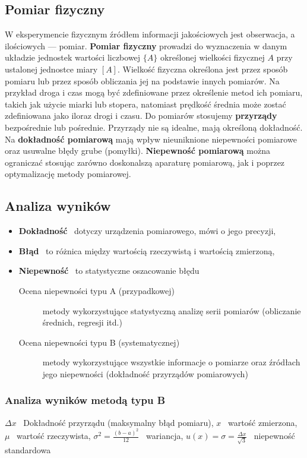 \documentclass[../Fizyka.tex]{subfiles}
\begin{document}
    \subsection{Pomiar fizyczny}
    W eksperymencie fizycznym źródłem informacji jakościowych jest obserwacja, a ilościowych — pomiar. \textbf{Pomiar fizyczny} prowadzi do wyznaczenia 
    w danym układzie jednostek wartości liczbowej \(\{A\}\) określonej wielkości fizycznej \(A\) przy ustalonej jednostce miary \([A]\).
    Wielkość fizyczna określona jest przez sposób pomiaru lub przez sposób obliczania jej na podstawie innych pomiarów.
    Na przykład droga i czas mogą być zdefiniowane przez określenie metod ich pomiaru, takich jak użycie miarki lub stopera, natomiast
    prędkość średnia może zostać zdefiniowana jako iloraz drogi i czasu.
    Do pomiarów stosujemy \textbf{przyrządy} bezpośrednie lub pośrednie. Przyrządy nie są idealne, mają określoną dokładność.
    Na \textbf{dokładność pomiarową} mają wpływ nieuniknione niepewności pomiarowe oraz usuwalne błędy grube (pomyłki).
    \textbf{Niepewność pomiarową} można ograniczać stosując zarówno doskonalszą aparaturę pomiarową, jak i poprzez optymalizację metody pomiarowej.

    \subsection{Analiza wyników}
    \begin{itemize}
        \item \textbf{Dokładność} \textendash\ dotyczy urządzenia pomiarowego, mówi o jego precyzji,
        \item \textbf{Błąd} \textendash\ to różnica między wartością rzeczywistą i wartością zmierzoną,
        \item \textbf{Niepewność} \textendash\ to statystyczne oszacowanie błędu
        \begin{description}
            \item[Ocena niepewności typu A (przypadkowej)] metody wykorzystujące statystyczną analizę serii pomiarów (obliczanie średnich, regresji itd.)
            \item[Ocena niepewności typu B (systematycznej)] metody wykorzystujące wszystkie informacje o pomiarze oraz źródłach jego niepewności (dokładność przyrządów pomiarowych) 
        \end{description}
    \end{itemize}

    \subsubsection{Analiza wyników metodą typu B}
    \(\Delta x\) \textendash\ Dokładność przyrządu (maksymalny błąd pomiaru),\newline
    \(x\) \textendash\ wartość zmierzona,\newline
    \(\mu\) \textendash\ wartość rzeczywista,\newline
    \(\sigma^2=\frac{(b-a)^2}{12}\) \textendash\ wariancja,\newline
    \(u(x)=\sigma=\frac{\Delta x}{\sqrt{3}}\) \textendash\ niepewność standardowa
\end{document}
